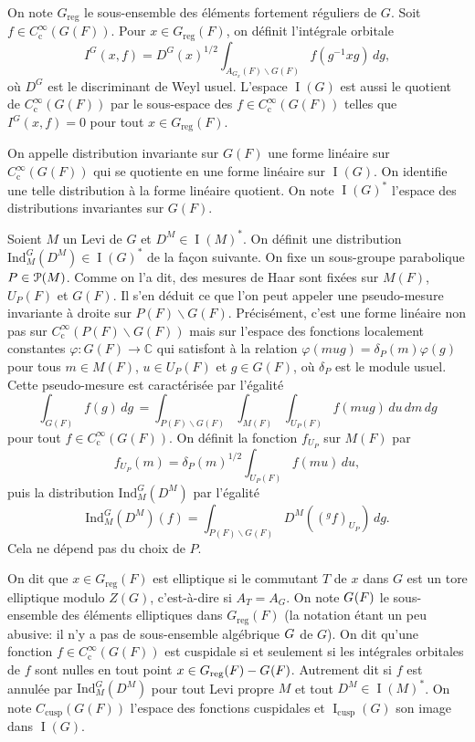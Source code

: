 \documentclass[11pt]{article}
\numberwithin{equation}{section}\providecommand{\og}{«\,}\providecommand{\fg}{\,»}
\let\mathcal \EuScript
\newcommand{\NoChangel}[1]{%
\expandafter\let\csname old\string#1\endcsname=#1
\let#1=\relax
\newcommand{#1}{\mathcode`l="716C\csname old\string#1\endcsname\mathcode`l="7160 }%
}
\newcommand{\rc}{\mathrm{c}}
\newcommand{\cusp}{\mathrm{cusp}}
\newcommand{\rell}{\mathrm{ell}} \NoChangel{\rell}
\newcommand{\Ind}{\mathrm{Ind}}
\newcommand{\reg}{\mathrm{reg}}
\DeclareMathOperator{\rI}{I}
\newcommand{\cP}{\mathcal{P}}
\newcommand{\CC}{\mathbb{C}}
\theoremstyle{plain}
\theoremstyle{definition}
\begin{document}
On note $G_{\reg}$ le sous-ensemble des éléments fortement réguliers de $G$. Soit $f\in C_{\rc}^{\infty}(G(F))$. Pour $x\in G_{\reg}(F)$, on définit l'intégrale orbitale
\[
I^G(x,f)=D^G(x)^{1/2}\int_{A_{G_{x}}(F)\backslash G(F)}f(g^{-1}xg)\,dg,
\]
où $D^G$ est le discriminant de Weyl usuel. L'espace $\rI(G)$ est aussi le quotient de $C_{\rc}^{\infty}(G(F))$ par le sous-espace des $f\in C_{\rc}^{\infty}(G(F))$ telles que $I^G(x,f)=0$ pour tout $x\in G_{\reg}(F)$.

On appelle distribution invariante sur $G(F)$ une forme linéaire sur $C_{\rc}^{\infty}(G(F))$ qui se quotiente en une forme linéaire sur $\rI(G)$. On identifie une telle distribution à la forme linéaire quotient. On note $\rI(G)^*$ l'espace des distributions invariantes sur $G(F)$.

Soient $M$ un Levi de $G$ et $D^M\in \rI(M)^*$. On définit une distribution $\Ind_{M}^G(D^M)\in \rI(G)^*$ de la façon suivante. On fixe un sous-groupe parabolique $P\in \cP(M)$. Comme on l'a dit, des mesures de Haar sont fixées sur $M(F)$, $U_{P}(F)$ et $G(F)$. Il s'en déduit ce que l'on peut appeler une pseudo-mesure invariante à droite sur $P(F)\backslash G(F)$. Précisément, c'est une forme linéaire non pas sur $C_{\rc}^{\infty}(P(F)\backslash G(F))$ mais sur l'espace des fonctions localement constantes $\varphi:G(F)\to \CC$ qui satisfont à la relation $\varphi(mug)=\delta_{P}(m)\varphi(g)$ pour tous $m\in M(F)$, $u\in U_{P}(F)$ et $g\in G(F)$, où $\delta_{P}$ est le module usuel. Cette pseudo-mesure est caractérisée par l'égalité
\[
\int_{G(F)}f(g)\,dg\,=\int_{P(F)\backslash G(F)}\int_{M(F)}\int_{U_{P}(F)}f(mug)\,du\,dm\,dg
\]
pour tout $f\in C_{\rc}^{\infty}(G(F))$.
On définit la fonction $f_{U_{P}}$ sur $M(F)$ par
\[
f_{U_{P}}(m)=\delta_{P}(m)^{1/2}\int_{U_{P}(F)}f(mu)\,du,
\]
puis la distribution $\Ind_{M}^G(D^M)$ par l'égalité
\[
\Ind_{M}^G(D^M)(f)=\int_{P(F)\backslash G(F)}D^M(({^g}f)_{U_{P}})\,dg.
\]
Cela ne dépend pas du choix de $P$.

On dit que $x\in G_{\reg}(F)$ est elliptique si le commutant $T$ de $x$ dans $G$ est un tore elliptique modulo $Z(G)$, c'est-à-dire si $A_{T}=A_{G}$. On note $G_{\rell}(F)$ le sous-ensemble des éléments elliptiques dans $G_{\reg}(F)$ (la notation étant un peu abusive: il n'y a pas de sous-ensemble algébrique $G_{\rell}$ de $G$). On dit qu'une fonction $f\in C_{\rc}^{\infty}(G(F))$ est cuspidale si et seulement si les intégrales orbitales de $f$ sont nulles en tout point $x\in G_{\reg}(F)-G_{\rell}(F)$. Autrement dit si $f$ est annulée par $\Ind_{M}^G(D^M)$ pour tout Levi propre $M$ et tout $D^M\in \rI(M)^*$. On note $C_{\cusp}(G(F))$ l'espace des fonctions cuspidales et $\rI_{\cusp}(G)$ son image dans $\rI(G)$.
\end{document}

